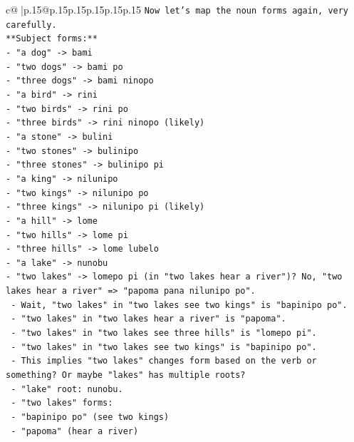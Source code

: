 \documentclass{article}
\begin{document}
{\begin{supertabular}{c@{$\;$}|p{.15\linewidth}@{}p{.15\linewidth}p{.15\linewidth}p{.15\linewidth}p{.15\linewidth}p{.15\linewidth}}
{{{\texttt{Now let's map the noun forms again, very carefully.} \\
\texttt{**Subject forms:**} \\
\texttt{{-} "a dog" {-}> bami} \\
\texttt{{-} "two dogs" {-}> bami po} \\
\texttt{{-} "three dogs" {-}> bami ninopo} \\
\texttt{{-} "a bird" {-}> rini} \\
\texttt{{-} "two birds" {-}> rini po} \\
\texttt{{-} "three birds" {-}> rini ninopo (likely)} \\
\texttt{{-} "a stone" {-}> bulini} \\
\texttt{{-} "two stones" {-}> bulinipo} \\
\texttt{{-} "three stones" {-}> bulinipo pi} \\
\texttt{{-} "a king" {-}> nilunipo} \\
\texttt{{-} "two kings" {-}> nilunipo po} \\
\texttt{{-} "three kings" {-}> nilunipo pi (likely)} \\
\texttt{{-} "a hill" {-}> lome} \\
\texttt{{-} "two hills" {-}> lome pi} \\
\texttt{{-} "three hills" {-}> lome lubelo} \\
\texttt{{-} "a lake" {-}> nunobu} \\
\texttt{{-} "two lakes" {-}> lomepo pi (in "two lakes hear a river")? No, "two lakes hear a river" => "papoma pana nilunipo po".} \\
\texttt{  {-} Wait, "two lakes" in "two lakes see two kings" is "bapinipo po".} \\
\texttt{  {-} "two lakes" in "two lakes hear a river" is "papoma".} \\
\texttt{  {-} "two lakes" in "two lakes see three hills" is "lomepo pi".} \\
\texttt{  {-} "two lakes" in "two lakes see two kings" is "bapinipo po".} \\
\texttt{  {-} This implies "two lakes" changes form based on the verb or something? Or maybe "lakes" has multiple roots?} \\
\texttt{  {-} "lake" root: nunobu.} \\
\texttt{  {-} "two lakes" forms:} \\
\texttt{    {-} "bapinipo po" (see two kings)} \\
\texttt{    {-} "papoma" (hear a river)} \\
}}}
\end{supertabular}}
\end{document}
